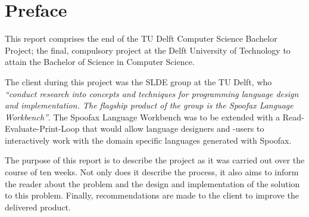 \chapter{Preface}
\label{cha:preface}

This report comprises the end of the TU Delft Computer Science Bachelor Project;
the final, compulsory project at the Delft University of Technology to attain
the Bachelor of Science in Computer Science.

The client during this project was the SLDE group at the TU Delft, who
\textit{``conduct research into concepts and techniques for programming language
design and implementation. The flagship product of the group is the Spoofax
Language Workbench''}. The Spoofax Language Workbench was to be extended with a
Read-Evaluate-Print-Loop that would allow language designers and -users to
interactively work with the domain specific languages generated with Spoofax.

The purpose of this report is to describe the project as it was carried out over
the course of ten weeks. Not only does it describe the process, it also aims to
inform the reader about the problem and the design and implementation of the
solution to this problem. Finally, recommendations are made to the client to
improve the delivered product.

